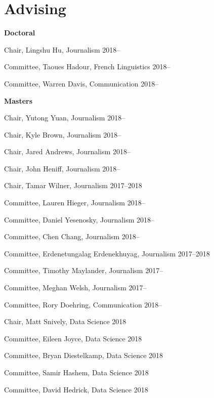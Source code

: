 
\section{Advising}

  \textbf{Doctoral}
    \begin{innerlist}
      \item Chair, Lingshu Hu, Journalism                            \hfill 2018--
      \item Committee, Taoues Hadour, French Linguistics             \hfill 2018--
      \item Committee, Warren Davis, Communication                   \hfill 2018--
    \end{innerlist}\vspace{1em}

  \textbf{Masters}
    \begin{innerlist}
      \item Chair, Yutong Yuan, Journalism                           \hfill 2018--
      \item Chair, Kyle Brown, Journalism                            \hfill 2018--
      \item Chair, Jared Andrews, Journalism                         \hfill 2018--
      \item Chair, John Heniff, Journalism                           \hfill 2018--
      \item Chair, Tamar Wilner, Journalism                          \hfill 2017--2018
      \item Committee, Lauren Hieger, Journalism                     \hfill 2018--
      \item Committee, Daniel Yesenosky, Journalism                  \hfill 2018--
      \item Committee, Chen Chang, Journalism                        \hfill 2018--
      \item Committee, Erdenetungalag Erdenekhuyag, Journalism       \hfill 2017--2018
      \item Committee, Timothy Maylander, Journalism                 \hfill 2017--
      \item Committee, Meghan Welsh, Journalism                      \hfill 2017--
      \item Committee, Rory Doehring, Communication                  \hfill 2018--
      \item Chair, Matt Snively, Data Science                        \hfill 2018
      \item Committee, Eileen Joyce, Data Science                    \hfill 2018
      \item Committee, Bryan Diestelkamp, Data Science               \hfill 2018
      \item Committee, Samir Hashem, Data Science                    \hfill 2018
      \item Committee, David Hedrick, Data Science                   \hfill 2018
    \end{innerlist}\vspace{-.1in}
